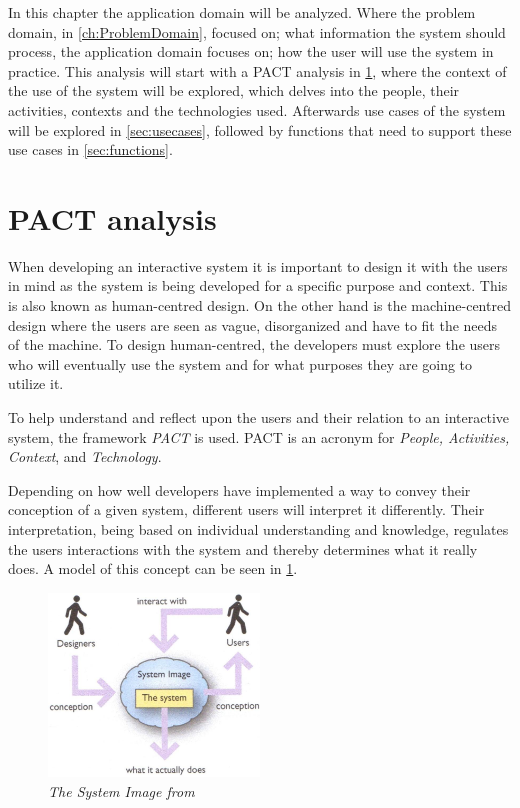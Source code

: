 In this chapter the application domain will be analyzed.
Where the problem domain, in \cref{ch:ProblemDomain}, focused on; what information the system should process, the application domain focuses on; how the user will use the system in practice.
This analysis will start with a PACT \cite{Benyon} analysis in \cref{sec:PACT}, where the context of the use of the system will be explored, which delves into the people, their activities, contexts and the technologies used.
Afterwards use cases of the system will be explored in \cref{sec:usecases}, followed by functions that need to support these use cases in \cref{sec:functions}.

\section{PACT analysis}\label{sec:PACT}
When developing an interactive system it is important to design it with the users in mind as the system is being developed for a specific purpose and context.
This is also known as human-centred design.
On the other hand is the machine-centred design where the users are seen as vague, disorganized and have to fit the needs of the machine.
To design human-centred, the developers must explore the users who will eventually use the system and for what purposes they are going to utilize it.

To help understand and reflect upon the users and their relation to an interactive system, the framework \textit{PACT} is used.
PACT is an acronym for \textit{People, Activities, Context}, and \textit{Technology}.

Depending on how well developers have implemented a way to convey their conception of a given system, different users will interpret it differently.
Their interpretation, being based on individual understanding and knowledge, regulates the users interactions with the system and thereby determines what it really does.
A model of this concept can be seen in \cref{fig:PACT-SystemImage}.

\begin{figure}[H]
	\centering
	\includegraphics[width=0.5\textwidth]{billeder/SystemImage-Benyon.jpg}
	\caption{\textit{The System Image from \citep[p.~31]{Benyon}}}
	\label{fig:PACT-SystemImage}
\end{figure}

